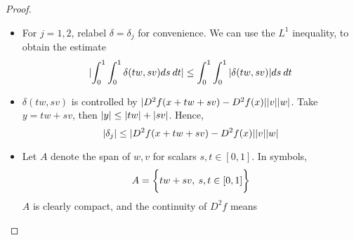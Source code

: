 \documentclass[../main-v2-manifolds.tex]{subfiles}
\begin{document}
\begin{proof}
\begin{note}
    \begin{itemize}
        \item For $j=1,2$, relabel $\delta = \delta_j$ for convenience. We can use the $L^1$ inequality, to obtain the estimate
        \begin{equation}\label{second-derivative-step2}
            \vert { \int_0^1\int_0^1\delta(tw,sv)ds\: dt} \vert \leq \int_0^1\int_0^1\vert {\delta(tw,sv)} \vert ds\: dt
        \end{equation}
        \item $\delta(tw,sv)$ is controlled by $\vert {D^2f(x + tw + sv) - D^2f(x)} \vert\vert {v} \vert\vert {w} \vert$. Take $y = tw+sv$, then $\vert {y} \vert \leq \vert {tw} \vert + \vert {sv} \vert$. Hence,
        \begin{equation}\label{second-derivative-control-on-rhs}
            \vert\delta_j\vert\leq\vert {D^2 f(x + tw + sv) - D^2f(x)} \vert\vert {v} \vert\vert {w} \vert
        \end{equation}
        \item Let $A$ denote the span of $w,v$ for scalars $s,t\in[0,1]$. In symbols,
        \[
            A = \biggl\{{tw+sv,\: s,t\in [0,1]}\biggr\}
        \]
        $A$ is clearly compact, and the continuity of $D^2f$ means 
        

\end{itemize}
\end{note}
\end{proof}
\end{document}

